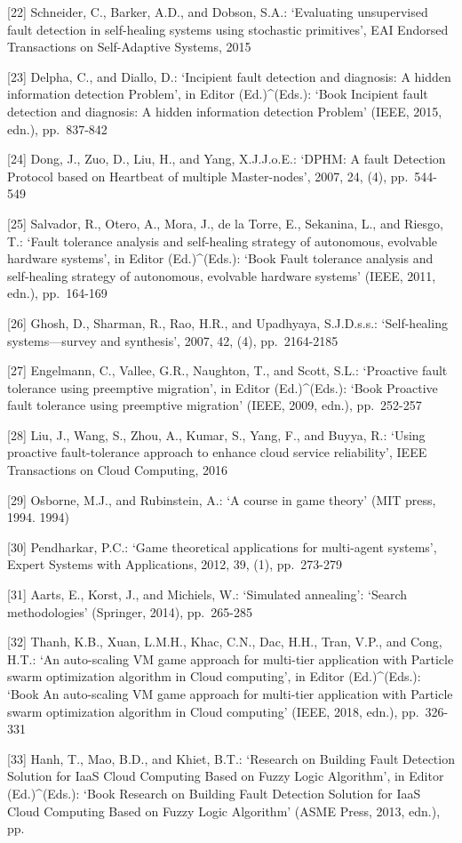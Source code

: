 \documentclass[
  vietnamese,
]{article}
\begin{document}
{[}22{]} Schneider, C., Barker, A.D., and Dobson, S.A.: `Evaluating
unsupervised fault detection in self-healing systems using stochastic
primitives', EAI Endorsed Transactions on Self-Adaptive Systems, 2015

{[}23{]} Delpha, C., and Diallo, D.: `Incipient fault detection and
diagnosis: A hidden information detection Problem', in Editor
(Ed.)\^{}(Eds.): `Book Incipient fault detection and diagnosis: A hidden
information detection Problem' (IEEE, 2015, edn.), pp.~837-842

{[}24{]} Dong, J., Zuo, D., Liu, H., and Yang, X.J.J.o.E.: `DPHM: A
fault Detection Protocol based on Heartbeat of multiple Master-nodes',
2007, 24, (4), pp.~544-549

{[}25{]} Salvador, R., Otero, A., Mora, J., de la Torre, E., Sekanina,
L., and Riesgo, T.: `Fault tolerance analysis and self-healing strategy
of autonomous, evolvable hardware systems', in Editor (Ed.)\^{}(Eds.):
`Book Fault tolerance analysis and self-healing strategy of autonomous,
evolvable hardware systems' (IEEE, 2011, edn.), pp.~164-169

{[}26{]} Ghosh, D., Sharman, R., Rao, H.R., and Upadhyaya, S.J.D.s.s.:
`Self-healing systems---survey and synthesis', 2007, 42, (4),
pp.~2164-2185

{[}27{]} Engelmann, C., Vallee, G.R., Naughton, T., and Scott, S.L.:
`Proactive fault tolerance using preemptive migration', in Editor
(Ed.)\^{}(Eds.): `Book Proactive fault tolerance using preemptive
migration' (IEEE, 2009, edn.), pp.~252-257

{[}28{]} Liu, J., Wang, S., Zhou, A., Kumar, S., Yang, F., and Buyya,
R.: `Using proactive fault-tolerance approach to enhance cloud service
reliability', IEEE Transactions on Cloud Computing, 2016

{[}29{]} Osborne, M.J., and Rubinstein, A.: `A course in game theory'
(MIT press, 1994. 1994)

{[}30{]} Pendharkar, P.C.: `Game theoretical applications for
multi-agent systems', Expert Systems with Applications, 2012, 39, (1),
pp.~273-279

{[}31{]} Aarts, E., Korst, J., and Michiels, W.: `Simulated annealing':
`Search methodologies' (Springer, 2014), pp.~265-285

{[}32{]} Thanh, K.B., Xuan, L.M.H., Khac, C.N., Dac, H.H., Tran, V.P.,
and Cong, H.T.: `An auto-scaling VM game approach for multi-tier
application with Particle swarm optimization algorithm in Cloud
computing', in Editor (Ed.)\^{}(Eds.): `Book An auto-scaling VM game
approach for multi-tier application with Particle swarm optimization
algorithm in Cloud computing' (IEEE, 2018, edn.), pp.~326-331

{[}33{]} Hanh, T., Mao, B.D., and Khiet, B.T.: `Research on Building
Fault Detection Solution for IaaS Cloud Computing Based on Fuzzy Logic
Algorithm', in Editor (Ed.)\^{}(Eds.): `Book Research on Building Fault
Detection Solution for IaaS Cloud Computing Based on Fuzzy Logic
Algorithm' (ASME Press, 2013, edn.), pp.
\end{document}
